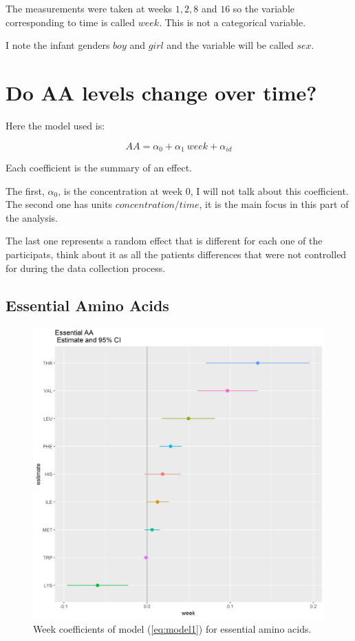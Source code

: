 \documentclass[12pt]{article}
\begin{document}
The measurements were taken at weeks $1, 2, 8$ and $16$ so the variable corresponding to time is called $week$. This is not a categorical variable.

I note the infant genders $boy$ and $girl$ and the variable will be called $sex$.

\section{Do AA levels change over time?}

Here the model used is:

\begin{equation} \label{eq:model1}
  AA = \alpha_0 + \alpha_1 \ week + \alpha_{id}
\end{equation}

Each coefficient is the summary of an effect.

The first, $\alpha_0$, is the concentration at week $0$, I will not talk about this coefficient. The second one has units $concentration/time$, it is the main focus in this part of the analysis.

The last one represents a random effect that is different for each one of the participats, think about it as all the patients differences that were not controlled for during the data collection process.

\subsection{Essential Amino Acids}

\begin{figure}[!htb]
  \includegraphics[width= \textwidth]{../week/EAA_W_coeff.png}
  \caption{Week coefficients of model (\ref{eq:model1}) for essential amino acids.}
  \label{fig:EAA_W_coeff}
\end{figure}
\end{document}
